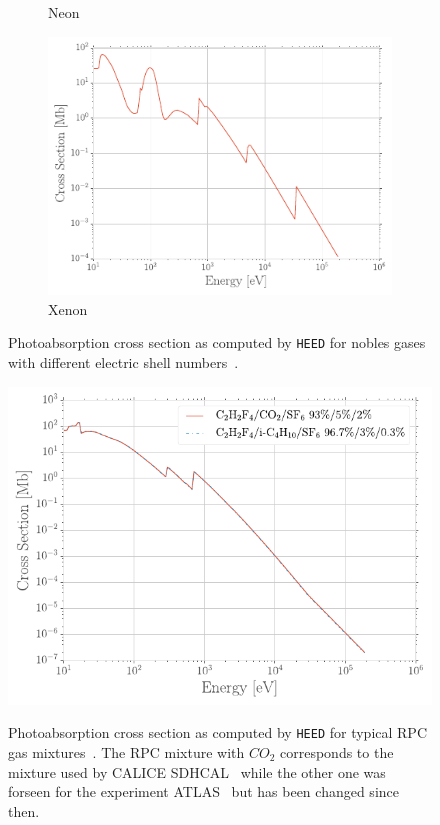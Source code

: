 \begin{figure}[H]
\begin{subfigure}{0.5\linewidth}
			\caption{\label{fig:PAIR:C} Neon}
		\end{subfigure}
		\begin{subfigure}{0.5\linewidth}
			\centering
			\includegraphics[width = 0.5\plotwidth]{fig/chapt4/HEED-Xenon.pdf}
			\caption{\label{fig:PAIR:D} Xenon}
		\end{subfigure}
		\caption{\label{fig:PAIR} Photoabsorption cross section as computed by \texttt{HEED} for nobles gases with different electric shell numbers~\cite{VINCENT2017}.}
	\end{figure}
	
	\begin{figure}[H]
		\centering
		\includegraphics[width = 0.7\plotwidth]{fig/chapt4/HEED-RPC.pdf}\\
		\caption{\label{fig:PAIR-RPC} Photoabsorption cross section as computed by \texttt{HEED} for typical RPC gas mixtures~\cite{VINCENT2017}. The RPC mixture with $CO_2$ corresponds to the mixture used by CALICE SDHCAL~\cite{ARNAUD2015} while the other one was forseen for the experiment ATLAS~\cite{RIEGLER2003} but has been changed since then.}
	\end{figure}
	
